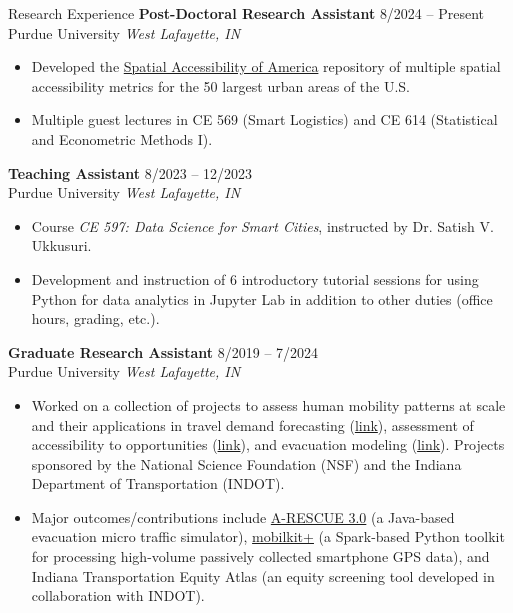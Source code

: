 \documentclass{CV} %
\begin{document}
\begin{rSection}{Research Experience}
    {\bf Post-Doctoral Research Assistant} \hfill {8/2024 – Present}
    \\ Purdue University \hfill {\em West Lafayette, IN}
    \begin{itemize}[noitemsep]
        \item Developed the \href{https://github.com/rvanxer/spr_4711}{Spatial Accessibility of America} repository of multiple spatial accessibility metrics for the 50 largest urban areas of the U.S.
        \item Multiple guest lectures in CE 569 (Smart Logistics) and CE 614 (Statistical and Econometric Methods I).
    \end{itemize}
    
    {\bf Teaching Assistant} \hfill {8/2023 – 12/2023}
    \\ Purdue University \hfill {\em West Lafayette, IN}
    \begin{itemize}[noitemsep]
        \item Course {\em CE 597: Data Science for Smart Cities}, instructed by Dr. Satish V. Ukkusuri.
        \item Development and instruction of 6 introductory tutorial sessions for using Python for data analytics in Jupyter Lab in addition to other duties (office hours, grading, etc.).
    \end{itemize}
    
    {\bf Graduate Research Assistant} \hfill {8/2019 – 7/2024}
    \\ Purdue University \hfill {\em West Lafayette, IN}
    \begin{itemize}[noitemsep]
        \item Worked on a collection of projects to assess human mobility patterns at scale and their applications in travel demand forecasting (\href{https://doi.org/10.5703/1288284317685}{link}), assessment of accessibility to opportunities (\href{https://rip.trb.org/View/2057911}{link}), and evacuation modeling (\href{https://www.nsf.gov/awardsearch/showAward?AWD_ID=1520338}{link}). Projects sponsored by the National Science Foundation (NSF) and the Indiana Department of Transportation (INDOT).
        \item Major outcomes/contributions include \href{https://umnilab.github.io/HSEES_doc/}{A-RESCUE 3.0} (a Java-based evacuation micro traffic simulator), \href{https://github.com/rvanxer/mk}{mobilkit+} (a Spark-based Python toolkit for processing high-volume passively collected smartphone GPS data), and Indiana Transportation Equity Atlas (an equity screening tool developed in collaboration with INDOT).
    \end{itemize}
    

\end{rSection}
\end{document}
